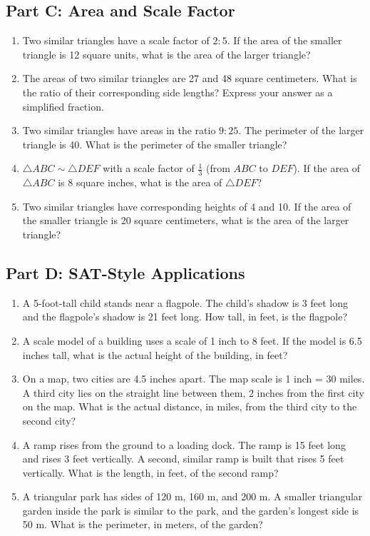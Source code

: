 \documentclass[14pt]{extarticle}
\begin{document}
\subsection*{Part C: Area and Scale Factor}
\begin{enumerate}
  \item Two similar triangles have a scale factor of \(2:5\). If the area of the smaller triangle is 12 square units, what is the area of the larger triangle?
  \item The areas of two similar triangles are 27 and 48 square centimeters. What is the ratio of their corresponding side lengths? Express your answer as a simplified fraction.
  \item Two similar triangles have areas in the ratio \(9:25\). The perimeter of the larger triangle is 40. What is the perimeter of the smaller triangle?
  \item \(\triangle ABC \sim \triangle DEF\) with a scale factor of \(\frac{1}{3}\) (from \(ABC\) to \(DEF\)). If the area of \(\triangle ABC\) is 8 square inches, what is the area of \(\triangle DEF\)?
  \item Two similar triangles have corresponding heights of 4 and 10. If the area of the smaller triangle is 20 square centimeters, what is the area of the larger triangle?
\end{enumerate}

\subsection*{Part D: SAT-Style Applications}
\begin{enumerate}
  \item A 5-foot-tall child stands near a flagpole. The child's shadow is 3 feet long and the flagpole's shadow is 21 feet long. How tall, in feet, is the flagpole?
  \item A scale model of a building uses a scale of 1 inch to 8 feet. If the model is 6.5 inches tall, what is the actual height of the building, in feet?
  \item On a map, two cities are 4.5 inches apart. The map scale is 1 inch = 30 miles. A third city lies on the straight line between them, 2 inches from the first city on the map. What is the actual distance, in miles, from the third city to the second city?
  \item A ramp rises from the ground to a loading dock. The ramp is 15 feet long and rises 3 feet vertically. A second, similar ramp is built that rises 5 feet vertically. What is the length, in feet, of the second ramp?
  \item A triangular park has sides of 120 m, 160 m, and 200 m. A smaller triangular garden inside the park is similar to the park, and the garden's longest side is 50 m. What is the perimeter, in meters, of the garden?
\end{enumerate}
\end{document}
